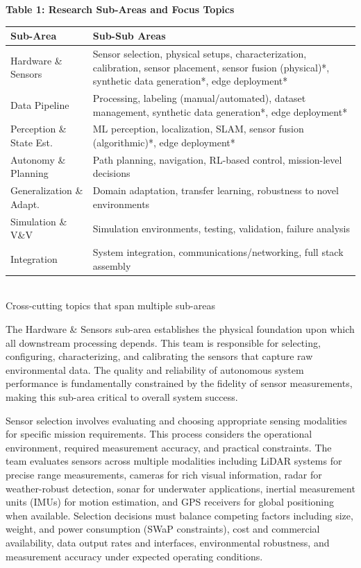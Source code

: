 \documentclass[12pt]{article}
\newcommand{\sect}[1]{\noindent{\color{garnet}\textbf{\textsc{#1}}.}}
\newcommand{\subsect}[1]{\noindent{\color{garnet}\textit{#1.}}}
\begin{document}
\noindent\textbf{Table 1: Research Sub-Areas and Focus Topics}\\[0.2em]
\noindent\begin{tabular}{@{}p{}p{}@{}}
\hline
\textbf{Sub-Area} & \textbf{Sub-Sub Areas} \\
\hline
Hardware \& Sensors & Sensor selection, physical setups, characterization, calibration, sensor placement, sensor fusion (physical)*, synthetic data generation*, edge deployment* \\[0.3em]
Data Pipeline & Processing, labeling (manual/automated), dataset management, synthetic data generation*, edge deployment* \\[0.3em]
Perception \& State Est. & ML perception, localization, SLAM, sensor fusion (algorithmic)*, edge deployment* \\[0.3em]
Autonomy \& Planning & Path planning, navigation, RL-based control, mission-level decisions \\[0.3em]
Generalization \& Adapt. & Domain adaptation, transfer learning, robustness to novel environments \\[0.3em]
Simulation \& V\&V & Simulation environments, testing, validation, failure analysis \\[0.3em]
Integration & System integration, communications/networking, full stack assembly \\
\hline
\end{tabular}\\[0.3em]
{\small *Cross-cutting topics that span multiple sub-areas}

\sect{Hardware \& Sensors} The Hardware \& Sensors sub-area establishes the physical foundation upon which all downstream processing depends. This team is responsible for selecting, configuring, characterizing, and calibrating the sensors that capture raw environmental data. The quality and reliability of autonomous system performance is fundamentally constrained by the fidelity of sensor measurements, making this sub-area critical to overall system success.

\subsect{Sensor Selection} Sensor selection involves evaluating and choosing appropriate sensing modalities for specific mission requirements. This process considers the operational environment, required measurement accuracy, and practical constraints. The team evaluates sensors across multiple modalities including LiDAR systems for precise range measurements, cameras for rich visual information, radar for weather-robust detection, sonar for underwater applications, inertial measurement units (IMUs) for motion estimation, and GPS receivers for global positioning when available. Selection decisions must balance competing factors including size, weight, and power consumption (SWaP constraints), cost and commercial availability, data output rates and interfaces, environmental robustness, and measurement accuracy under expected operating conditions.
\end{document}
